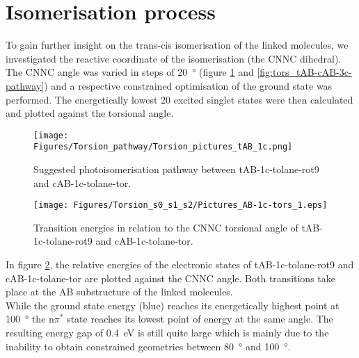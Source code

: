 \section{Isomerisation process}
To gain further insight on the trans-cis isomerisation of the linked molecules, we investigated the reactive coordinate of the isomerisation (the CNNC dihedral).
The CNNC angle was varied in steps of \SI{20}{\degree} (figure \ref{fig:tors_tAB-cAB-1c-pathway} and \ref{fig:tors_tAB-cAB-3c-pathway}) and a respective constrained optimisation of the ground state was performed. 
The energetically lowest 20 excited singlet states were then calculated and plotted against the torsional angle. 
%
%
%
%
%
\begin{figure}[H]
    \centering
    \texttt{[image: Figures/Torsion\_pathway/Torsion\_pictures\_tAB\_1c.png]}
    \caption{Suggested photoisomerisation pathway between tAB-1c-tolane-rot9 and cAB-1c-tolane-tor.}
    \label{fig:tors_tAB-cAB-1c-pathway}
\end{figure}
%
%
\begin{figure}[H]
    \centering
    \texttt{[image: Figures/Torsion\_s0\_s1\_s2/Pictures\_AB-1c-tors\_1.eps]}
    \caption{Transition energies in relation to the CNNC torsional angle of tAB-1c-tolane-rot9 and cAB-1c-tolane-tor.}
    \label{fig:tors_tAB-cAB-1c}
\end{figure}
%
In figure \ref{fig:tors_tAB-cAB-1c}, the relative energies of the electronic states of tAB-1c-tolane-rot9 and cAB-1c-tolane-tor are plotted against the CNNC angle. 
Both transitions take place at the AB substructure of the linked molecules. \\
While the ground state energy (blue) reaches its energetically highest point at \SI{100}{\degree} the n$\pi^{*}$ state reaches its lowest point of energy at the same angle. 
The resulting energy gap of \SI{0.4}{\eV} is still quite large which is mainly due to the inability to obtain constrained geometries between \SI{80}{\degree} and \SI{100}{\degree}. 
